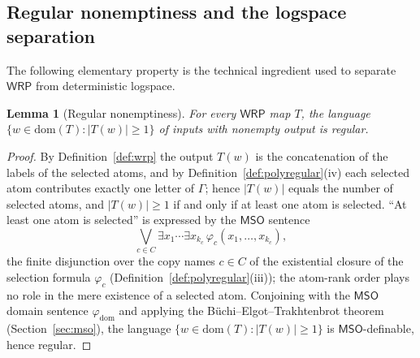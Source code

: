 \documentclass[11pt]{article}
\newtheorem{lemma}[theorem]{Lemma}
\theoremstyle{definition}
\newcommand{\WRP}{\mathsf{WRP}}
\newcommand{\MSO}{\mathsf{MSO}}
\begin{document}
\subsection{Regular nonemptiness and the logspace separation}

The following elementary property is the technical ingredient used to separate
$\WRP$ from deterministic logspace.

\begin{lemma}[Regular nonemptiness]
\label{lem:wrp-nonempty-regular}
For every $\WRP$ map $T$, the language
$\{w\in\mathrm{dom}(T):|T(w)|\ge 1\}$ of inputs with nonempty output is
regular.
\end{lemma}

\begin{proof}
By Definition~\ref{def:wrp} the output $T(w)$ is the concatenation of the
labels of the selected atoms, and by Definition~\ref{def:polyregular}(iv)
each selected atom contributes exactly one letter of $\Gamma$; hence
$|T(w)|$ equals the number of selected atoms, and $|T(w)|\ge 1$ if and
only if at least one atom is selected.  ``At least one atom is selected''
is expressed by the $\MSO$ sentence
\[
   \bigvee_{c\in C}\exists x_1\cdots\exists x_{k_c}\,
       \varphi_c(x_1,\ldots,x_{k_c}),
\]
the finite disjunction over the copy names $c\in C$ of the existential closure
of the selection formula $\varphi_c$ (Definition~\ref{def:polyregular}(iii));
the atom-rank order plays no role in the mere existence of a selected atom.
Conjoining with the $\MSO$ domain sentence $\varphi_{\mathrm{dom}}$ and
applying the B\"uchi--Elgot--Trakhtenbrot theorem
(Section~\ref{sec:mso}), the
language $\{w\in\mathrm{dom}(T):|T(w)|\ge 1\}$ is $\MSO$-definable, hence
regular.
\end{proof}
\end{document}
